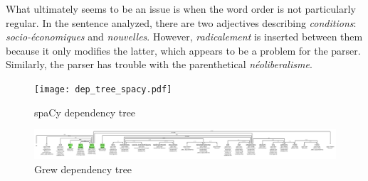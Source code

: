 \documentclass{article}
\newcommand{\lexi}[1]{\textit{#1}}
\begin{document}
  What ultimately seems to be an issue is when the word order is not particularly regular.
  In the sentence analyzed, there are two adjectives describing \lexi{conditions}: \lexi{socio-économiques} and \lexi{nouvelles}.
  However, \lexi{radicalement} is inserted between them because it only modifies the latter, which appears to be a problem for the parser.
  Similarly, the parser has trouble with the parenthetical \lexi{néoliberalisme}.
  \begin{figure}[tbh]
    \caption{spaCy dependency tree}
    \label{fig:spacy}
    \centering
    \texttt{[image: dep\_tree\_spacy.pdf]}
  \end{figure}
  \begin{figure}[tbh]
    \caption{Grew dependency tree}
    \label{fig:grew}
    \centering
    \includegraphics[scale=0.095]{dep_tree_grew.jpg}
  \end{figure}
\end{document}

